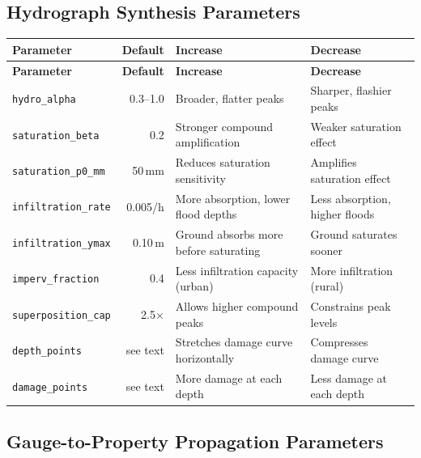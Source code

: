 \documentclass[11pt,a4paper]{article}
\begin{document}
\subsection{Hydrograph Synthesis Parameters}

\begin{longtable}{p{4.2cm}rp{3.5cm}p{3.5cm}}
\toprule
\textbf{Parameter} & \textbf{Default} & \textbf{Increase} & \textbf{Decrease} \\
\midrule
\endfirsthead
\toprule
\textbf{Parameter} & \textbf{Default} & \textbf{Increase} & \textbf{Decrease} \\
\midrule
\endhead
\texttt{hydro\_alpha} & 0.3--1.0 &
  Broader, flatter peaks &
  Sharper, flashier peaks \\[4pt]
\texttt{saturation\_beta} & 0.2 &
  Stronger compound amplification &
  Weaker saturation effect \\[4pt]
\texttt{saturation\_p0\_mm} & 50\,mm &
  Reduces saturation sensitivity &
  Amplifies saturation effect \\[4pt]
\texttt{infiltration\_rate} & 0.005/h &
  More absorption, lower flood depths &
  Less absorption, higher floods \\[4pt]
\texttt{infiltration\_ymax} & 0.10\,m &
  Ground absorbs more before saturating &
  Ground saturates sooner \\[4pt]
\texttt{imperv\_fraction} & 0.4 &
  Less infiltration capacity (urban) &
  More infiltration (rural) \\[4pt]
\texttt{superposition\_cap} & 2.5$\times$ &
  Allows higher compound peaks &
  Constrains peak levels \\[4pt]
\texttt{depth\_points} & see text &
  Stretches damage curve horizontally &
  Compresses damage curve \\[4pt]
\texttt{damage\_points} & see text &
  More damage at each depth &
  Less damage at each depth \\
\bottomrule
\end{longtable}

\subsection{Gauge-to-Property Propagation Parameters}
\end{document}
